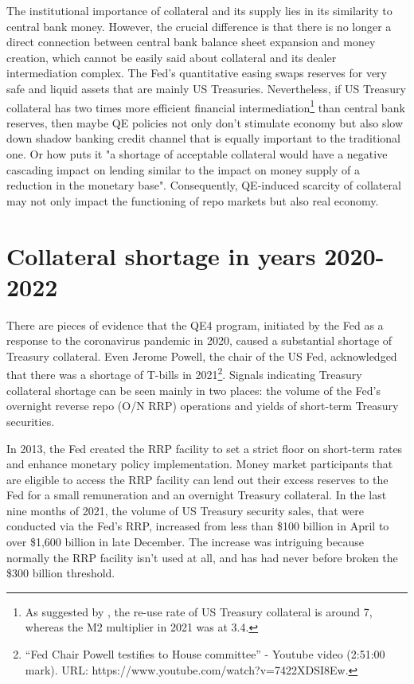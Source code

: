 \documentclass[11pt,a4paper,english,oneside]{article}
\begin{document}
The institutional importance of collateral and its supply lies in its similarity to central bank money. However, the crucial difference is that there is no longer a direct connection between central bank balance sheet expansion and money creation, which cannot be easily said about collateral and its dealer intermediation complex. The Fed's quantitative easing swaps reserves for very safe and liquid assets that are mainly US Treasuries. Nevertheless, if US Treasury collateral has two times more efficient financial intermediation\footnote{As suggested by \citet{infante2020}, the re-use rate of US Treasury collateral is around 7, whereas the M2 multiplier in 2021 was at 3.4.} than central bank reserves, then maybe QE policies not only don't stimulate economy but also slow down shadow banking credit channel that is equally important to the traditional one. Or how \citet{singh2020} puts it "a shortage of acceptable collateral would have a negative cascading impact on lending similar to the impact on money supply of a reduction in the monetary base". Consequently, QE-induced scarcity of collateral may not only impact the functioning of repo markets but also real economy.

\newpage

\section{Collateral shortage in years 2020-2022} \label{sec:shortage}%

There are pieces of evidence that the QE4 program, initiated by the Fed as a response to the coronavirus pandemic in 2020, caused a substantial shortage of Treasury collateral. Even Jerome Powell, the chair of the US Fed, acknowledged that there was a shortage of T-bills in 2021\footnote{“Fed Chair Powell testifies to House committee” - Youtube video (2:51:00 mark). URL: https://www.youtube.com/watch?v=7422XDSI8Ew.}. Signals indicating Treasury collateral shortage can be seen mainly in two places: the volume of the Fed's overnight reverse repo (O/N RRP) operations and yields of short-term Treasury securities.

In 2013, the Fed created the RRP facility to set a strict floor on short-term rates and enhance monetary policy implementation. Money market participants that are eligible to access the RRP facility can lend out their excess reserves to the Fed for a small remuneration and an overnight Treasury collateral. In the last nine months of 2021, the volume of US Treasury security sales, that were conducted via the Fed's RRP, increased from less than \$100 billion in April to over \$1,600 billion in late December. The increase was intriguing because normally the RRP facility isn't used at all, and has had never before broken the \$300 billion threshold.
\end{document}
